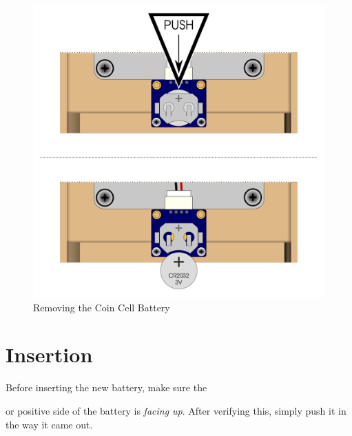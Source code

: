 \begin{figure}[H]
\centering
  \includegraphics{images/coin_cell_battery.png}
\caption{Removing the Coin Cell Battery}
\end{figure}

\section{Insertion} \label{SD Insertion}


Before inserting the new battery, make sure the
or positive side of the battery is \textit{facing up}.  After verifying this,
simply push it in the way it came out.

